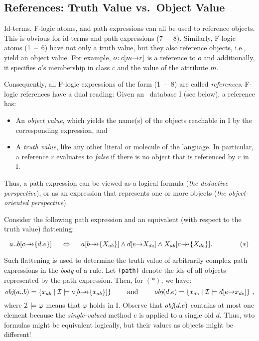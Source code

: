 \documentclass[11pt]{report}
\begin{document}
\subsection{References: Truth Value vs.\ Object Value}\label{sec-references}

Id-terms, F-logic atoms, and path expressions can all be used to
reference objects. This is obvious for id-terms and path
expressions (7~--~8). Similarly, F-logic atoms (1~--~6) have not only a
truth value, but they also reference objects, i.e., yield an object value.
For example, $o\,{\bf{:}}\, c[m{\rightarrow} r]$ is a reference to $o$ and additionally,
it specifies $o$'s membership in class $c$ and the value of the attribute $m$.

Consequently, all F-logic expressions of the form (1~--~8) are called
\emph{references}. F-logic references have a dual reading: Given an
\fl\ database \db I (see below), a reference has:
\begin{itemize}
\item An \emph{object value}, which yields the name(s) of the objects
  reachable in \db I by the corresponding expression, and 
\item A \emph{truth value}, like any other literal or molecule of the
  language. In particular, a reference $r$ evaluates to \emph{false} if
  there is no object that is referenced by $r$ in \db I.
\end{itemize}
Thus, a path expression can be viewed as a logical formula (\emph{the
  deductive perspective}), or as an expression that represents one or more
objects (\emph{the object-oriented perspective}).

Consider the following path expression and an equivalent (with respect to
the truth value) flattening:

\begin{displaymath}
a..b[c\mvd\{d.e\}] \quad\ \Leftrightarrow \quad\  a[b\mvd\{X_{ab}\}]
\land d[e\fd X_{de}] \land X_{ab}[c\mvd\{X_{de}\}]. \hspace{4em} (*)
\end{displaymath}


\noindent
Such flattening is used to determine the truth value of arbitrarily complex
path expressions in the \emph{body} of a rule.  Let {\tt \obj(path)} denote
the ids of all objects represented by the path expression. Then, for $(*)$,
we have:
\begin{displaymath}
\textit{obj}(a..b) = \{x_{ab} \mid \mathcal{I} \models a[b{\rightarrow\!\!\!\!\rightarrow}\{x_{ab}\}]\}
\qquad\textrm{ and }\qquad \textit{obj}(d.e) = \{x_{de} \mid \mathcal{I} \models d[e{\rightarrow} 
x_{de}]\} ~,
\end{displaymath}
%
where $\mathcal{I} \models \varphi$ means that $\varphi$ holds in \db I.
Observe that $\textit{obj}(d.e)$ contains at most one element because the
\emph{single-valued} method $e$ is applied to a single oid $d$. Thus, wto
formulas might be equivalent logically, but their values as objects might
be different!
\end{document}
